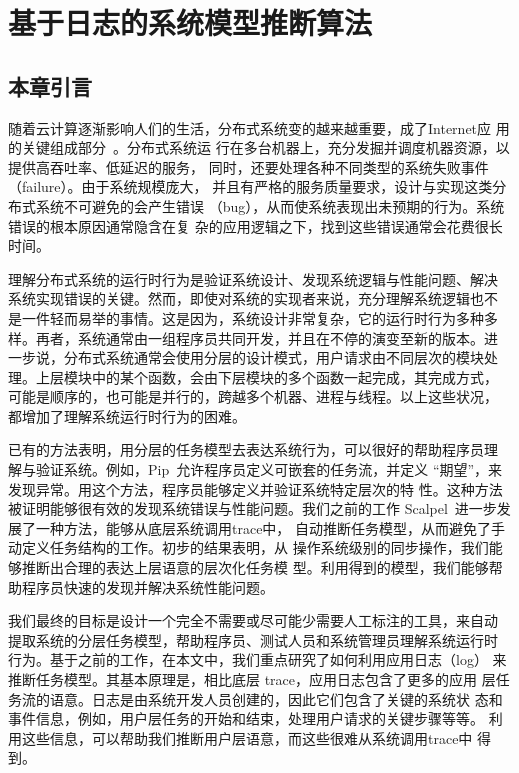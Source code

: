 \chapter{基于日志的系统模型推断算法}
\label{chap:logmining}

\section{本章引言}

随着云计算逐渐影响人们的生活，分布式系统变的越来越重要，成了Internet应
用的关键组成部分~\cite{gfs, mapreduce, bigtable, dynamo}。分布式系统运
行在多台机器上，充分发掘并调度机器资源，以提供高吞吐率、低延迟的服务，
同时，还要处理各种不同类型的系统失败事件（failure）。由于系统规模庞大，
并且有严格的服务质量要求，设计与实现这类分布式系统不可避免的会产生错误
（bug），从而使系统表现出未预期的行为。系统错误的根本原因通常隐含在复
杂的应用逻辑之下，找到这些错误通常会花费很长时间。

理解分布式系统的运行时行为是验证系统设计、发现系统逻辑与性能问题、解决
系统实现错误的关键。然而，即使对系统的实现者来说，充分理解系统逻辑也不
是一件轻而易举的事情。这是因为，系统设计非常复杂，它的运行时行为多种多
样。再者，系统通常由一组程序员共同开发，并且在不停的演变至新的版本。进
一步说，分布式系统通常会使用分层的设计模式，用户请求由不同层次的模块处
理。上层模块中的某个函数，会由下层模块的多个函数一起完成，其完成方式，
可能是顺序的，也可能是并行的，跨越多个机器、进程与线程。以上这些状况，
都增加了理解系统运行时行为的困难。

已有的方法表明，用分层的任务模型去表达系统行为，可以很好的帮助程序员理
解与验证系统。例如，Pip~\cite{pip}允许程序员定义可嵌套的任务流，并定义
“期望”，来发现异常。用这个方法，程序员能够定义并验证系统特定层次的特
性。这种方法被证明能够很有效的发现系统错误与性能问题。我们之前的工作
Scalpel~\cite{scalpel}进一步发展了一种方法，能够从底层系统调用trace中，
自动推断任务模型，从而避免了手动定义任务结构的工作。初步的结果表明，从
操作系统级别的同步操作，我们能够推断出合理的表达上层语意的层次化任务模
型。利用得到的模型，我们能够帮助程序员快速的发现并解决系统性能问题。

我们最终的目标是设计一个完全不需要或尽可能少需要人工标注的工具，来自动
提取系统的分层任务模型，帮助程序员、测试人员和系统管理员理解系统运行时
行为。基于之前的工作，在本文中，我们重点研究了如何利用应用日志（log）
来推断任务模型。其基本原理是，相比底层 trace，应用日志包含了更多的应用
层任务流的语意。日志是由系统开发人员创建的，因此它们包含了关键的系统状
态和事件信息，例如，用户层任务的开始和结束，处理用户请求的关键步骤等等。
利用这些信息，可以帮助我们推断用户层语意，而这些很难从系统调用trace中
得到。

